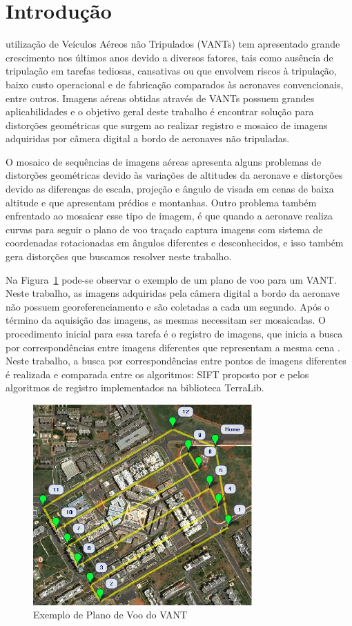\documentclass[9pt, a4paper, nofonttune, journal]{IEEEtran}
\begin{document}
\section{Introdução}
 utilização de Veículos Aéreos não Tripulados (VANTs) tem apresentado grande crescimento nos últimos anos devido a diversos fatores, 
tais como ausência de tripulação em tarefas tediosas, cansativas ou que envolvem riscos à tripulação, 
baixo custo operacional e de fabricação comparados às aeronaves convencionais, entre outros. 
Imagens aéreas obtidas através de VANTs possuem grandes aplicabilidades \cite{Canhoto}
 e o objetivo geral deste trabalho é encontrar solução para distorções geométricas que surgem ao realizar registro e mosaico de imagens adquiridas por câmera digital a bordo de aeronaves não tripuladas.

O mosaico de sequências de imagens aéreas apresenta alguns problemas de distorções geométricas devido às variações de altitudes da aeronave e 
distorções devido as diferenças de escala, projeção e ângulo de visada em cenas de baixa altitude e que apresentam prédios e montanhas. 
Outro problema também enfrentado ao mosaicar esse tipo de imagem, 
é que quando a aeronave realiza curvas para seguir o plano de voo traçado captura imagens com sistema de coordenadas rotacionadas em ângulos diferentes e desconhecidos, 
e isso também gera distorções que buscamos resolver neste trabalho.

Na Figura~\ref{fig:plano_voo} pode-se observar o exemplo de um plano de voo para um VANT. 
Neste trabalho, as imagens adquiridas pela câmera digital a bordo da aeronave não possuem georeferenciamento e são coletadas a cada um segundo. 
Após o término da aquisição das imagens, as mesmas necessitam ser mosaicadas. 
O procedimento inicial para essa tarefa é o registro de imagens, que inicia a busca por correspondências entre imagens diferentes que representam a mesma cena \cite{Goltz:08}. 
Neste trabalho, a busca por correspondências entre pontos de imagens diferentes é realizada e comparada entre os algoritmos: SIFT proposto por \cite{Lowe} 
e pelos algoritmos de registro implementados na biblioteca TerraLib.

\begin{figure}[h!t]
  \centering
  \includegraphics[width=3.3in]{figuras/plano_voo}
  \caption{Exemplo de Plano de Voo do VANT}
  \label{fig:plano_voo}
\end{figure}
\end{document}
